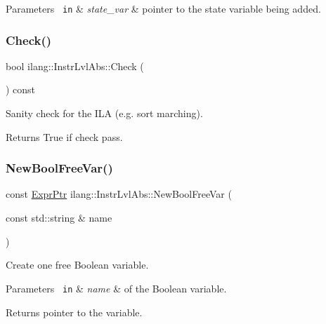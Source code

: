 \begin{DoxyParams}[1]{Parameters}
\mbox{\texttt{ in}}  & {\em state\+\_\+var} & pointer to the state variable being added. \\
\hline
\end{DoxyParams}
\mbox{\label{classilang_1_1_instr_lvl_abs_a888c4e60c93c65ee3a711dde7be6af61}} 
\subsubsection{\texorpdfstring{Check()}{Check()}}
{\footnotesize\ttfamily bool ilang\+::\+Instr\+Lvl\+Abs\+::\+Check (\begin{DoxyParamCaption}{ }\end{DoxyParamCaption}) const}



Sanity check for the I\+LA (e.\+g. sort marching). 

\begin{DoxyReturn}{Returns}
True if check pass. 
\end{DoxyReturn}
\mbox{\label{classilang_1_1_instr_lvl_abs_a330e24d4208d1f7bcf9b4f4ad314eaf4}} 
\subsubsection{\texorpdfstring{New\+Bool\+Free\+Var()}{NewBoolFreeVar()}}
{\footnotesize\ttfamily const \mbox{\hyperlink{namespaceilang_a7c4196c72e53ea4df4b7861af7bc3bce}{Expr\+Ptr}} ilang\+::\+Instr\+Lvl\+Abs\+::\+New\+Bool\+Free\+Var (\begin{DoxyParamCaption}\item[{const std\+::string \&}]{name }\end{DoxyParamCaption})}



Create one free Boolean variable. 


\begin{DoxyParams}[1]{Parameters}
\mbox{\texttt{ in}}  & {\em name} & of the Boolean variable. \\
\hline
\end{DoxyParams}
\begin{DoxyReturn}{Returns}
pointer to the variable. 
\end{DoxyReturn}
\mbox{\label{classilang_1_1_instr_lvl_abs_ab470870aff4b75bcbe35a239890a5079}} 
